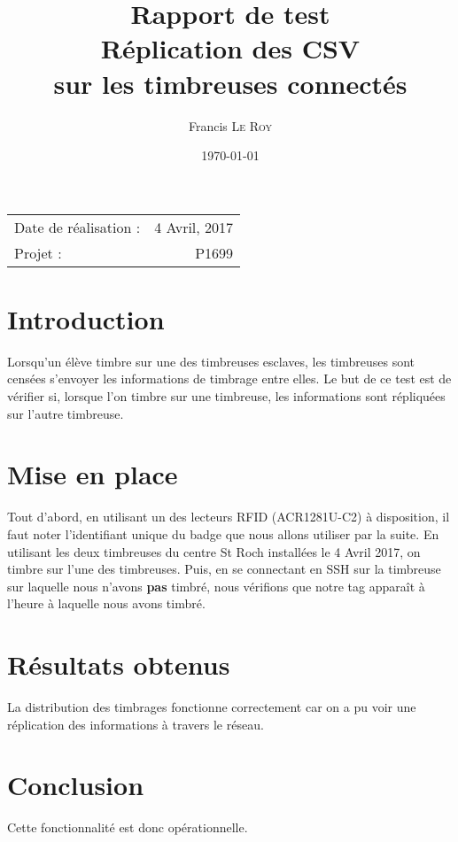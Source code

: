 \documentclass[10pt,a4paper,onecolumn]{article}
\title{Rapport de test \\ Réplication des CSV \\ sur les timbreuses connectés}
\author{Francis \textsc{Le Roy}}
\date{\today}
\begin{document}
\maketitle
\thispagestyle{fancy}

\begin{center}
\begin{tabular}{l r}
Date de réalisation : & 4 Avril, 2017 \\
Projet : & P1699 \\
\end{tabular}
\end{center}

\section{Introduction}
Lorsqu'un élève timbre sur une des timbreuses esclaves, les timbreuses sont censées s'envoyer les informations de timbrage entre elles. Le but de ce test est de vérifier si, lorsque l'on timbre sur une timbreuse, les informations sont répliquées sur l'autre timbreuse.
\section{Mise en place}
Tout d'abord, en utilisant un des lecteurs RFID (ACR1281U-C2) à disposition, il faut noter l'identifiant unique du badge que nous allons utiliser par la suite. En utilisant les deux timbreuses du centre St Roch installées le 4 Avril 2017, on timbre sur l'une des timbreuses. Puis, en se connectant en SSH sur la timbreuse sur laquelle nous n'avons \textbf{pas} timbré, nous vérifions que notre tag apparaît à l'heure à laquelle nous avons timbré.

\section{Résultats obtenus}
La distribution des timbrages fonctionne correctement car on a pu voir une réplication des informations à travers le réseau.
\section{Conclusion}
Cette fonctionnalité est donc opérationnelle.
\end{document}
